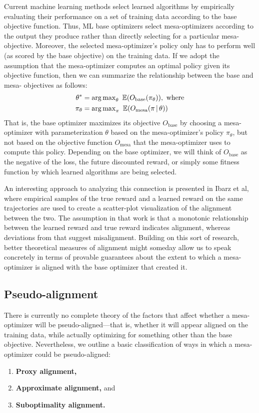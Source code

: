 \documentclass[
  onecolumn,
  natbib,
]{miri-tech-article}
\begin{document}
Current machine learning methods select learned algorithms by empirically evaluating their performance on a set of training data according to the base objective function. Thus, ML base optimizers select mesa-optimizers according to the output they produce rather than directly selecting for a particular mesa-objective. Moreover, the selected mesa-optimizer's policy only has to perform well (as scored by the base objective) on the training data. If we adopt the assumption that the mesa-optimizer computes an optimal policy given its objective function, then we can summarize the relationship between the base and mesa- objectives as follows:\cite{chris}
\begin{align*}
  \theta^* &= \operatorname{arg\,max}_\theta~ \mathbb E(O_{\text{base}}(\pi_\theta)),~ \text{where} \\
  \pi_\theta &= \operatorname{arg\,max}_\pi~ \mathbb E(O_{\text{mesa}}(\pi \,|\, \theta))
\end{align*}
That is, the base optimizer maximizes its objective $O_\text{base}$ by choosing a mesa-optimizer with parameterization $\theta$ based on the mesa-optimizer's policy $\pi_\theta$, but not based on the objective function $O_\text{mesa}$ that the mesa-optimizer uses to compute this policy. Depending on the base optimizer, we will think of $O_\text{base}$ as the negative of the loss, the future discounted reward, or simply some fitness function by which learned algorithms are being selected.

An interesting approach to analyzing this connection is presented in Ibarz et al, where empirical samples of the true reward and a learned reward on the same trajectories are used to create a scatter-plot visualization of the alignment between the two.\cite{ibarz} The assumption in that work is that a monotonic relationship between the learned reward and true reward indicates alignment, whereas deviations from that suggest misalignment. Building on this sort of research, better theoretical measures of alignment might someday allow us to speak concretely in terms of provable guarantees about the extent to which a mesa-optimizer is aligned with the base optimizer that created it.

\subsection{Pseudo-alignment}
\label{sec:3.1}

There is currently no complete theory of the factors that affect whether a mesa-optimizer will be pseudo-aligned---that is, whether it will appear aligned on the training data, while actually optimizing for something other than the base objective. Nevertheless, we outline a basic classification of ways in which a mesa-optimizer could be pseudo-aligned:
\begin{enumerate}
\item \textbf{Proxy alignment,}
\item \textbf{Approximate alignment,} and
\item \textbf{Suboptimality alignment.}
\end{enumerate}
\end{document}
